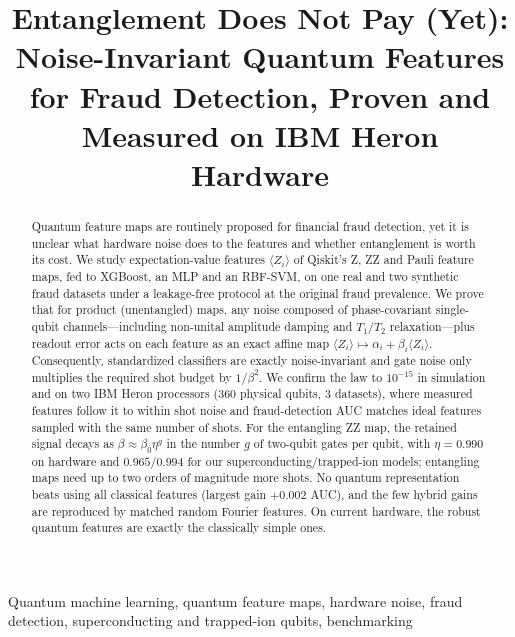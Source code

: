 \documentclass[conference,compsoc]{IEEEtran}
\newcommand{\ev}[1]{\langle #1\rangle}
\begin{document}
\title{Entanglement Does Not Pay (Yet): Noise-Invariant Quantum Features for Fraud Detection, Proven and Measured on IBM Heron Hardware}

\author{}

\maketitle

\begin{abstract}
Quantum feature maps are routinely proposed for financial fraud detection, yet it is unclear what hardware noise does to the features and whether entanglement is worth its cost. We study expectation-value features $\ev{Z_i}$ of Qiskit's Z, ZZ and Pauli feature maps, fed to XGBoost, an MLP and an RBF-SVM, on one real and two synthetic fraud datasets under a leakage-free protocol at the original fraud prevalence. We prove that for product (unentangled) maps, any noise composed of phase-covariant single-qubit channels---including non-unital amplitude damping and $T_1/T_2$ relaxation---plus readout error acts on each feature as an exact affine map $\ev{Z_i}\mapsto\alpha_i+\beta_i\ev{Z_i}$. Consequently, standardized classifiers are exactly noise-invariant and gate noise only multiplies the required shot budget by $1/\beta^2$. We confirm the law to $10^{-15}$ in simulation and on two IBM Heron processors (360 physical qubits, 3 datasets), where measured features follow it to within shot noise and fraud-detection AUC matches ideal features sampled with the same number of shots. For the entangling ZZ map, the retained signal decays as $\beta\approx\beta_0\eta^{g}$ in the number $g$ of two-qubit gates per qubit, with $\eta=0.990$ on hardware and $0.965$/$0.994$ for our superconducting/trapped-ion models; entangling maps need up to two orders of magnitude more shots. No quantum representation beats using all classical features (largest gain $+0.002$ AUC), and the few hybrid gains are reproduced by matched random Fourier features. On current hardware, the robust quantum features are exactly the classically simple ones.
\end{abstract}

\begin{IEEEkeywords}
Quantum machine learning, quantum feature maps, hardware noise, fraud detection, superconducting and trapped-ion qubits, benchmarking
\end{IEEEkeywords}
\end{document}
